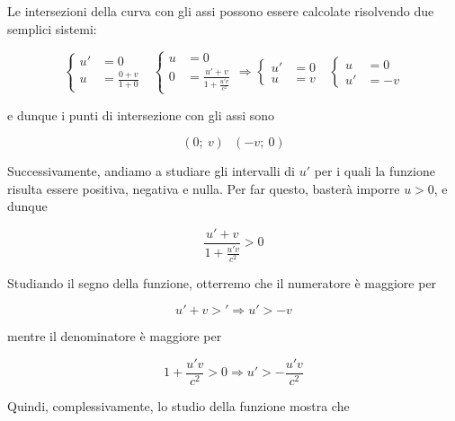 \documentclass{article}
\begin{document}
Le intersezioni della curva con gli assi possono essere calcolate
risolvendo due semplici sistemi:

\begin{equation}
    \left\{
        \begin{aligned}
        u' &= 0 \\
        u &= \frac{0 + v}{1 + 0}
        \end{aligned}
    \right.
    \ \ \
    \left\{
        \begin{aligned}
        u &= 0 \\
        0 &= \frac{u' + v}{1 + \frac{u'v}{c^2}}
        \end{aligned}
    \right.
    \Rightarrow
    \left\{
        \begin{aligned}
        u' &= 0 \\
        u &= v
        \end{aligned}
    \right.
    \ \ \
    \left\{
        \begin{aligned}
        u &= 0 \\
        u' &= -v
        \end{aligned}
    \right.
\end{equation}

e dunque i punti di intersezione con gli assi sono

\begin{equation}
    (0;\ v)\ \ \ (-v;\ 0)
\end{equation}

Successivamente, andiamo a studiare gli intervalli di \(u'\)
per i quali la funzione risulta essere positiva, negativa e nulla. Per
far questo, basterà imporre \(u > 0\), e dunque

\begin{equation}
    \frac{u' + v}{1 + \frac{u'v}{c^2}} > 0
\end{equation}

Studiando il segno della funzione, otterremo che il numeratore
è maggiore per

\begin{equation}
    u' + v > ' \Rightarrow u ' > -v
\end{equation}

mentre il denominatore è maggiore per

\begin{equation}
    1 + \frac{u'v}{c^2} > 0 \Rightarrow u' > - \frac{u'v}{c^2}
\end{equation}

Quindi, complessivamente, lo studio della funzione mostra che
\end{document}
